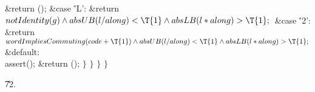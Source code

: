 \&{return} ();\6
\4\&{case} \.{'L'}:\6
\&{return} ${}\\{notIdentity}(\|g)\W\\{absUB}(\|l/\\{along})<\T{1}\W\\{absLB}(%
\|l*\\{along})>\T{1};{}$\6
\4\&{case} \.{'2'}:\6
\&{return} ${}\\{wordImpliesCommuting}(\\{code}+\T{1})\W\\{absUB}(\|l/%
\\{along})<\T{1}\W\\{absLB}(\|l*\\{along})>\T{1};{}$\6
\4\&{default}:\5
\\{assert}();\6
\&{return} ();\6
\4${}\}{}$\2\6
\4${}\}{}$\2\6
\4${}\}{}$\2\6
\4${}\}{}$\2\par
\U72.\fi

